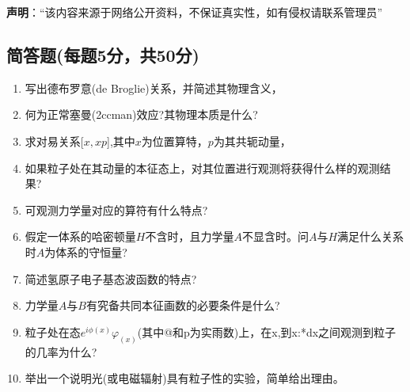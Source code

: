 
\textbf{声明}：“该内容来源于网络公开资料，不保证真实性，如有侵权请联系管理员”

\subsection{简答题(每题5分，共50分)}
\begin{enumerate}
\item 写出德布罗意(de Broglie)关系，并简述其物理含义，
\item 何为正常塞曼(2ccman)效应?其物理本质是什么?
\item 求对易关系[$x,xp$],其中$x$为位置算特，$p$为其共轭动量，
\item 如果粒子处在其动量的本征态上，对其位置进行观测将获得什么样的观测结果?
\item 可观测力学量对应的算符有什么特点?
\item 假定一体系的哈密顿量$H$不含时，且力学量$A$不显含时。问$A$与$H$满足什么关系时$A$为体系的守恒量?
\item 简述氢原子电子基态波函数的特点?
\item 力学量$A$与$B$有究备共同本征画数的必要条件是什么?
\item 粒子处在态$e^{i\phi(x)}\varphi_(x)$(其中@和p为实雨数)上，在x,到x:*dx之间观测到粒子的几率为什么?
\item 举出一个说明光(或电磁辐射)具有粒子性的实验，简单给出理由。
\end{enumerate}
